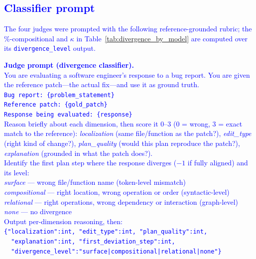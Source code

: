 \documentclass[12pt]{article}
\begin{document}
\subsection{\textcolor{blue}{Classifier prompt}}
\textcolor{blue}{The four judges were prompted with the following reference-grounded rubric; the \%-compositional and $\kappa$ in Table~\ref{tab:divergence_by_model} are computed over its \texttt{divergence\_level} output.}
\begin{tcolorbox}[colback=black!3, colframe=black!30, boxrule=0.4pt, left=10pt, right=10pt, top=8pt, bottom=8pt, fontupper=\small]
\textcolor{blue}{
\textbf{Judge prompt (divergence classifier).}\\[2pt]
You are evaluating a software engineer's response to a bug report. You are given the reference patch---the actual fix---and use it as ground truth.\\[3pt]
\texttt{Bug report: \{problem\_statement\}}\\
\texttt{Reference patch: \{gold\_patch\}}\\
\texttt{Response being evaluated: \{response\}}\\[3pt]
Reason briefly about each dimension, then score it $0$--$3$ ($0$ = wrong, $3$ = exact match to the reference): \emph{localization} (same file/function as the patch?), \emph{edit\_type} (right kind of change?), \emph{plan\_quality} (would this plan reproduce the patch?), \emph{explanation} (grounded in what the patch does?).\\[3pt]
Identify the first plan step where the response diverges ($-1$ if fully aligned) and its level:\\
\quad\emph{surface} --- wrong file/function name (token-level mismatch)\\
\quad\emph{compositional} --- right location, wrong operation or order (syntactic-level)\\
\quad\emph{relational} --- right operations, wrong dependency or interaction (graph-level)\\
\quad\emph{none} --- no divergence\\[3pt]
Output per-dimension reasoning, then:\\
\texttt{\{"localization":int, "edit\_type":int, "plan\_quality":int,}\\
\texttt{~~"explanation":int, "first\_deviation\_step":int,}\\
\texttt{~~"divergence\_level":"surface|compositional|relational|none"\}}
}
\end{tcolorbox}
\end{document}
